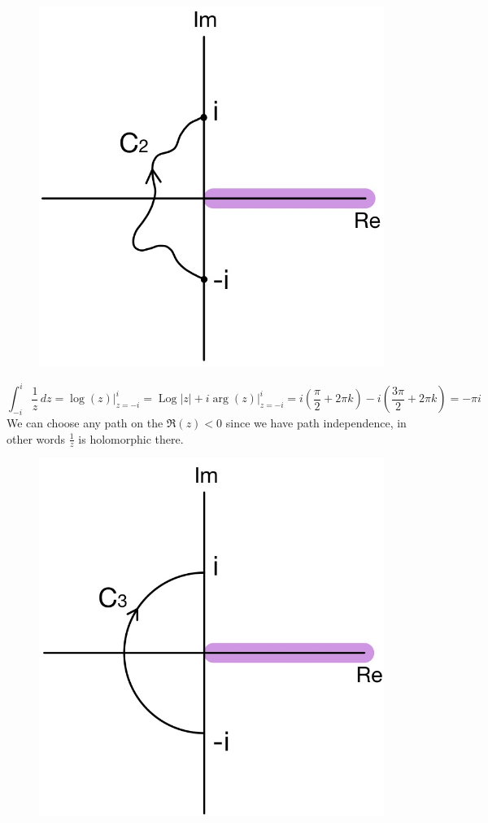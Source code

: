 \documentclass[11pt]{article}
\begin{document}
\begin{figure}[H]
\includegraphics[scale = 0.17]{12_5}
\centering
\end{figure}
\vspace{-5mm}
$$ \int_{-i}^i \frac{1}{z} \, dz = \operatorname{log}(z) \bigg\rvert_{z = -i}^i = \operatorname{Log}|z| + i\operatorname{arg}(z)\bigg\rvert_{z = -i}^{i} = i\left(\frac{\pi}{2}+ 2\pi k\right) - i\left(\frac{3\pi}{2} + 2\pi k\right) = -\pi i$$
We can choose any path on the $\Re(z) < 0$ since we have path independence, in other words $\frac{1}{z}$ is holomorphic there. 
\begin{figure}[H]
\includegraphics[scale = 0.17]{12_6}
\centering
\end{figure}
\end{document}
